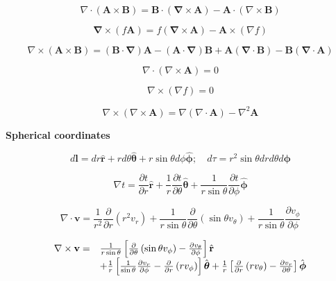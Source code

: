 \documentclass[11pt]{article}
\begin{document}
\[
\nabla \cdot ( \mathbf { A } \times \mathbf { B } ) = \mathbf { B } \cdot ( \mathbf { \nabla } \times \mathbf { A } ) - \mathbf { A } \cdot ( \nabla \times \mathbf { B } )
\]


\[
\boldsymbol { \nabla } \times ( f \mathbf { A } ) = f ( \mathbf { \nabla } \times \mathbf { A } ) - \mathbf { A } \times ( \nabla f )
\]


\[
\nabla \times ( \mathbf { A } \times \mathbf { B } ) = ( \mathbf { B } \cdot \mathbf { \nabla } ) \mathbf { A } - ( \mathbf { A } \cdot \mathbf { \nabla } ) \mathbf { B } + \mathbf { A } ( \mathbf { \nabla } \cdot \mathbf { B } ) - \mathbf { B } ( \mathbf { \nabla } \cdot \mathbf { A } )
\]


\[
\nabla \cdot ( \nabla \times \mathbf { A } ) = 0
\]


\[
\nabla \times ( \nabla f ) = 0
\]


\[
\nabla \times ( \nabla \times \mathbf { A } ) = \nabla ( \nabla \cdot \mathbf { A } ) - \nabla ^ { 2 } \mathbf { A }
\]

\newpage

{\bf Spherical coordinates}

\[
d \mathbf { l } = d r \hat { \mathbf { r } } + r d \theta \hat { \boldsymbol { \theta } } + r \sin \theta d \phi \hat { \boldsymbol { \phi } } ; \quad d \tau = r ^ { 2 } \sin \theta d r d \theta d \boldsymbol { \phi }
\]


\[
\nabla t = \frac { \partial t } { \partial r } \hat { \mathbf { r } } + \frac { 1 } { r } \frac { \partial t } { \partial \theta } \hat { \boldsymbol { \theta } } + \frac { 1 } { r \sin \theta } \frac { \partial t } { \partial \phi } \hat { \boldsymbol { \phi } }
\]



\[
\nabla \cdot \mathbf { v } = \frac { 1 } { r ^ { 2 } } \frac { \partial } { \partial r } \left( r ^ { 2 } v _ { r } \right) + \frac { 1 } { r \sin \theta } \frac { \partial } { \partial \theta } \left( \sin \theta v _ { \theta } \right) + \frac { 1 } { r \sin \theta } \frac { \partial v _ { \phi } } { \partial \phi }
\]


\[
\begin{array} { r l } { \nabla \times \mathbf { v } = } & { \frac { 1 } { r \sin \theta } \left[ \frac { \partial } { \partial \theta } \left( \sin \theta v _ { \phi } \right) - \frac { \partial v _ { \theta } } { \partial \phi } \right] \hat { \mathbf { r } } } \\ { } & { + \frac { 1 } { r } \left[ \frac { 1 } { \sin \theta } \frac { \partial v _ { r } } { \partial \phi } - \frac { \partial } { \partial r } \left( r v _ { \phi } \right) \right] \hat { \boldsymbol { \theta } } + \frac { 1 } { r } \left[ \frac { \partial } { \partial r } \left( r v _ { \theta } \right) - \frac { \partial v _ { r } } { \partial \theta } \right] \hat { \boldsymbol { \phi } } } \end{array}
\]
\end{document}

